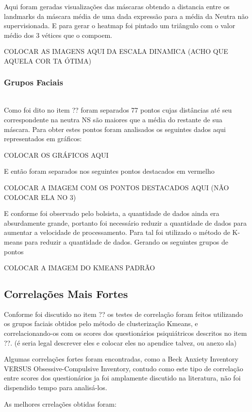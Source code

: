 Aqui foram geradas visualizações das máscaras obtendo a distancia entre os landmarks da máscara média de uma dada expressão para a média da Neutra não supervisionada. E para gerar o heatmap foi pintado um triângulo com o valor médio dos 3 vétices que o compoem.

COLOCAR AS IMAGENS AQUI DA ESCALA DINAMICA (ACHO QUE AQUELA COR TA ÓTIMA)

\subsubsection{Grupos Faciais}\mbox{}\\
Como foi dito no item ?? foram separados 77 pontos cujas distâncias até seu correspondente na neutra NS são maiores que a média do restante de sua máscara.
Para obter estes pontos foram analisados os seguintes dados aqui representados em gráficos:

COLOCAR OS GRÁFICOS AQUI

E então foram separados nos seguintes pontos destacados em vermelho

COLOCAR A IMAGEM COM OS PONTOS DESTACADOS AQUI (NÃO COLOCAR ELA NO 3)

E conforme foi observado pelo bolsista, a quantidade de dados ainda era absurdamente grande, portanto foi necessário reduzir a quantidade de dados para aumentar a velocidade de processamento. Para tal foi utilizado o método de K-means para reduzir a quantidade de dados. Gerando os seguintes grupos de pontos

COLOCAR A IMAGEM DO KMEANS PADRÃO

\subsection{Correlações Mais Fortes}
Conforme foi discutido no item ?? os testes de correlação foram feitos utilizando os grupos faciais obtidos pelo método de clusterização Kmeans, e correlacionando-os com os scores dos questionários psiquiátricos descritos no item ??. (é seria legal descrever eles e colocar eles no apendice talvez, ou anexo sla)

Algumas correlações fortes foram encontradas, como a Beck Anxiety Inventory VERSUS Obsessive-Compulsive Inventory, contudo como este tipo de correlação entre scores dos questionários ja foi amplamente discutido na literatura, não foi dispendido tempo para analisá-los.

As melhores crrelações obtidas foram:


